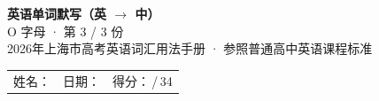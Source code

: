 \documentclass[10pt,a4paper]{article}
\begin{document}
\pagestyle{plain}

\begin{center}
{\LARGE\bfseries 英语单词默写（英 $\to$ 中）}\\[0.22em]
{\large O 字母 · 第 3 / 3 份}\\[0.18em]
{\small 2026年上海市高考英语词汇用法手册 · 参照普通高中英语课程标准}
\end{center}

\vspace{0.25em}
\noindent\begin{tabular}{@{}p{}@{}p{}@{}p{}@{}}
姓名：\underline{\hspace{2.0cm}} & 日期：\underline{\hspace{2.0cm}} & 得分：\underline{\hspace{1.3cm}}\,/\,34 \\
\end{tabular}

\vspace{0.3em}

\vspace{0.08em}
\end{document}
